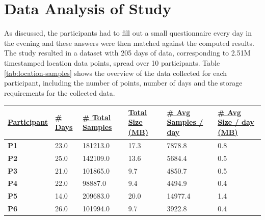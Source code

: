 \section{Data Analysis of Study}
As discussed, the participants had to fill out a small questionnaire every day in the evening and these answers were then matched against the computed results. The study resulted in a dataset with 205 days of data, corresponding to 2.51M timestamped location data points, spread over 10 participants. Table \ref{tab:location-samples} shows the overview of the data collected for each participant, including the number of points, number of days and the storage requirements for the collected data.
\begin{table}[]
    \centering
    \begin{tabular}{|l|l|l|l|l|l|}
    \hline
    {\ul \textbf{Participant}} & {\ul \textbf{\# Days}} & {\ul \textbf{\# Total Samples}} & {\ul \textbf{Total Size (MB)}} & {\ul \textbf{\# Avg Samples / day}} & {\ul \textbf{\# Avg Size / day (MB)}} \\ \hline
    \textbf{P1}                & 23.0                   & 181213.0                        & 17.3                           & 7878.8                              & 0.8                                   \\ \hline
    \textbf{P2}                & 25.0                   & 142109.0                        & 13.6                           & 5684.4                              & 0.5                                   \\ \hline
    \textbf{P3}                & 21.0                   & 101865.0                        & 9.7                            & 4850.7                              & 0.5                                   \\ \hline
    \textbf{P4}                & 22.0                   & 98887.0                         & 9.4                            & 4494.9                              & 0.4                                   \\ \hline
    \textbf{P5}                & 14.0                   & 209683.0                        & 20.0                           & 14977.4                             & 1.4                                   \\ \hline
    \textbf{P6}                & 26.0                   & 101994.0                        & 9.7                            & 3922.8                              & 0.4                                   \\ \hline

\end{tabular}
\end{table}
